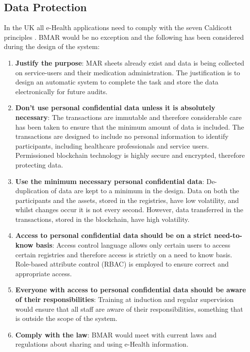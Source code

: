 \documentclass[runningheads]{llncs}
\begin{document}
\subsection{Data Protection}
In the UK all e-Health applications need to comply with the seven Caldicott principles \cite{caldicott:2013}. BMAR would be no exception and the following has been considered during the design of the system:
\begin{enumerate}
	\item \textbf{ Justify the purpose}: MAR sheets already exist and data is being collected on service-users and their medication administration. The justification is to design an automatic system to complete the task and store the data electronically for future audits.
	\item \textbf{ Don't use personal confidential data unless it is absolutely necessary}: The transactions are immutable and therefore considerable care has been taken to ensure that the minimum amount of data is included. The transactions are designed to include no personal information to identify participants, including healthcare professionals and service users. Permissioned  blockchain technology is highly secure and encrypted, therefore protecting data.
	\item \textbf{ Use the minimum necessary personal confidential data}: De-duplication of data are kept to a minimum in the design. Data on both the participants and the assets, stored in the registries, have low volatility, and whilst changes occur it is not every second. However, data transferred in the transactions, stored in the blockchain, have high volatility. 
	\item \textbf{ Access to personal confidential data should be on a strict need-to-know basis}: Access control language allows only certain users to access certain registries and therefore access is strictly on a need to know basis. Role-based attribute control (RBAC) \cite{kuhn2010adding} is employed to ensure correct and appropriate access.
	\item \textbf{ Everyone with access to personal confidential data should be aware of their responsibilities}: Training at induction and regular supervision would ensure that all staff are aware of their responsibilities, something that is outside the scope of the system. 
	\item \textbf{ Comply with the law}: BMAR would meet with current laws and regulations about sharing and using e-Health information. 

\end{enumerate}
\end{document}
